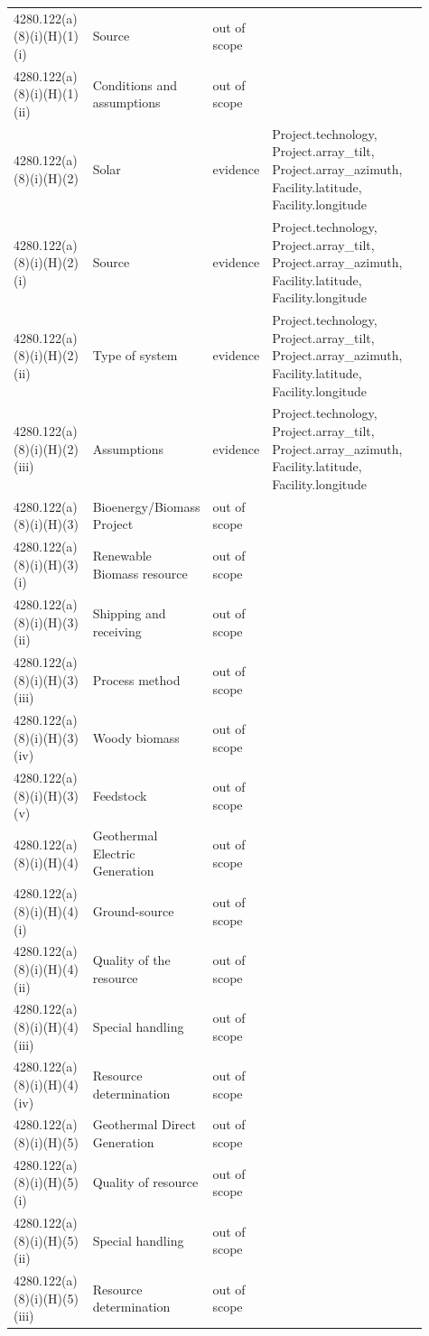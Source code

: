 \begin{longtable}{p{0.2\linewidth}p{0.2\linewidth}p{0.09\linewidth}p{0.42\linewidth}}
4280.122(a)(8)(i)(H)(1)(i) & Source & out of scope &  \\
4280.122(a)(8)(i)(H)(1)(ii) & Conditions and assumptions & out of scope &  \\
4280.122(a)(8)(i)(H)(2) & Solar & evidence & Project.technology, Project.array\_tilt, Project.array\_azimuth, Facility.latitude, Facility.longitude \\
4280.122(a)(8)(i)(H)(2)(i) & Source & evidence & Project.technology, Project.array\_tilt, Project.array\_azimuth, Facility.latitude, Facility.longitude \\
4280.122(a)(8)(i)(H)(2)(ii) & Type of system & evidence & Project.technology, Project.array\_tilt, Project.array\_azimuth, Facility.latitude, Facility.longitude \\
4280.122(a)(8)(i)(H)(2)(iii) & Assumptions & evidence & Project.technology, Project.array\_tilt, Project.array\_azimuth, Facility.latitude, Facility.longitude \\
4280.122(a)(8)(i)(H)(3) & Bioenergy/Biomass Project & out of scope &  \\
4280.122(a)(8)(i)(H)(3)(i) & Renewable Biomass resource & out of scope &  \\
4280.122(a)(8)(i)(H)(3)(ii) & Shipping and receiving & out of scope &  \\
4280.122(a)(8)(i)(H)(3)(iii) & Process method & out of scope &  \\
4280.122(a)(8)(i)(H)(3)(iv) & Woody biomass & out of scope &  \\
4280.122(a)(8)(i)(H)(3)(v) & Feedstock & out of scope &  \\
4280.122(a)(8)(i)(H)(4) & Geothermal Electric Generation & out of scope &  \\
4280.122(a)(8)(i)(H)(4)(i) & Ground-source & out of scope &  \\
4280.122(a)(8)(i)(H)(4)(ii) & Quality of the resource & out of scope &  \\
4280.122(a)(8)(i)(H)(4)(iii) & Special handling & out of scope &  \\
4280.122(a)(8)(i)(H)(4)(iv) & Resource determination & out of scope &  \\
4280.122(a)(8)(i)(H)(5) & Geothermal Direct Generation & out of scope &  \\
4280.122(a)(8)(i)(H)(5)(i) & Quality of resource & out of scope &  \\
4280.122(a)(8)(i)(H)(5)(ii) & Special handling & out of scope &  \\
4280.122(a)(8)(i)(H)(5)(iii) & Resource determination & out of scope &  \\

\end{longtable}
